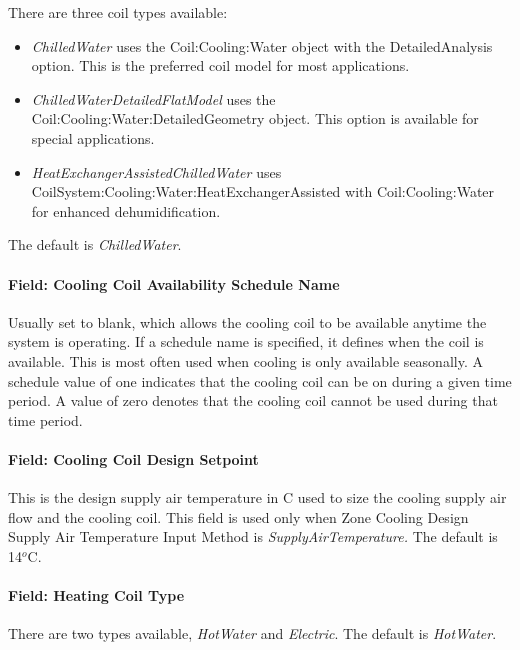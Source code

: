 There are three coil types available:

\begin{itemize}
\item
  \emph{ChilledWater} uses the Coil:Cooling:Water object with the DetailedAnalysis option. This is the preferred coil model for most applications.
\item
   \emph{ChilledWaterDetailedFlatModel} uses the Coil:Cooling:Water:DetailedGeometry object. This option is available for special applications.
\item
   \emph{HeatExchangerAssistedChilledWater} uses CoilSystem:Cooling:Water:HeatExchangerAssisted with Coil:Cooling:Water for enhanced dehumidification.
\end{itemize}

 The default is \emph{ChilledWater}.
 
\paragraph{Field: Cooling Coil Availability Schedule Name}\label{field-cooling-coil-availability-schedule-name}

Usually set to blank, which allows the cooling coil to be available anytime the system is operating. If a schedule name is specified, it defines when the coil is available. This is most often used when cooling is only available seasonally. A schedule value of one indicates that the cooling coil can be on during a given time period. A value of zero denotes that the cooling coil cannot be used during that time period.

\paragraph{Field: Cooling Coil Design Setpoint}\label{field-cooling-coil-design-setpoint}

This is the design supply air temperature in C used to size the cooling supply air flow and the cooling coil. This field is used only when Zone Cooling Design Supply Air Temperature Input Method is \emph{SupplyAirTemperature.} The default is 14\(^{o}\)C.

\paragraph{Field: Heating Coil Type}\label{field-heating-coil-type}

There are two types available, \emph{HotWater} and \emph{Electric}. The default is \emph{HotWater}.

